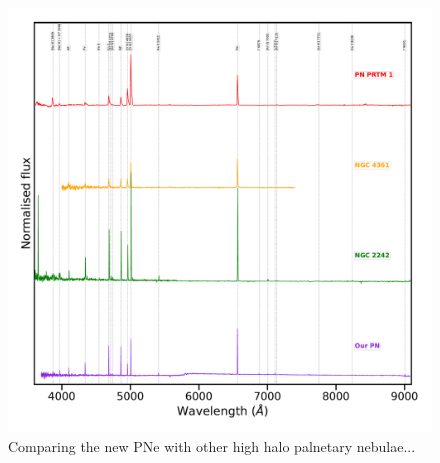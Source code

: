 \documentclass[twocolumn]{article}
\begin{document}
\newpage
\begin{figure}
\centering
\includegraphics[width=0.89\linewidth]{../Figs/spectra-compare.pdf}
  \caption{Comparing the new PNe with other high halo palnetary nebulae...} 
  \label{fig:compare-spectra}
\end{figure}
\end{document}
